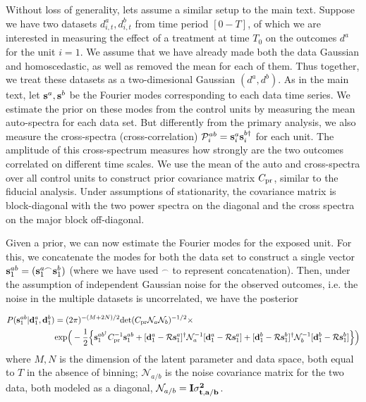 \documentclass{article}
\def\bs{{\bf s}}
\def\bd{{\bf d}}
\begin{document}
Without loss of generality, lets assume a similar setup to the main text. Suppose we have two datasets $d^a_{i, t}, d^b_{i, t}$ from time period $[0-T]$, of which we are interested in measuring the effect of a treatment at time $T_0$ on the outcomes $d^a$ for the unit $i=1$. We assume that we have already made both the data Gaussian and homoscedastic, as well as removed the mean for each of them. Thus together, we treat these datasets as a two-dimesional Gaussian $(d^a, d^b)$. As in the main text, let $\bs^a, \bs^b$ be the Fourier modes corresponding to each data time series. We estimate the prior on these modes from the control units by measuring the mean auto-spectra for each data set. But differently from the primary analysis, we also measure the cross-spectra (cross-correlation) $ \mathcal{P}_{i}^{ab} = \bs^a_i \bs_i^{b\dagger}$ for each unit. The amplitude of this cross-spectrum measures how strongly are the two outcomes correlated on different time scales. We use the mean of the auto and cross-spectra over all control units to construct prior covariance matrix $C_{\rm pr}$, similar to the fiducial analysis. Under assumptions of stationarity, the covariance matrix is block-diagonal with the two power spectra on the diagonal and the cross spectra on the major block off-diagonal. 

Given a prior, we can now estimate the Fourier modes for the exposed unit. For this, we concatenate the modes for both the data set to construct a single vector $\bs_1^{ab} = (\bs_1^{a \frown} \bs_1^b)$ (where we have used $^\frown$ to represent concatenation). Then, under the assumption of independent Gaussian noise for the observed outcomes, i.e. the noise in the multiple datasets is uncorrelated, we have the posterior

\begin{align}
    P(\bs_1^{ab}|\bd_1^a, \bd_1^b) &= (2\pi)^{-(M+2N)/2} {\rm det} (C_{\rm pr} \mathcal{N}_a \mathcal{N}_b)^{-1/2} \times \nonumber  \\
    & {\rm exp} \Big(-\frac{1}{2} \Big\{\bs_1^{ab^\dagger} C_{\rm pr}^{-1}\bs_1^{ab} + 
    [\bd_1^a - \mathcal{R}\bs_1^a]^\dagger \mathcal{N}^{-1}_a[\bd_1^a - \mathcal{R} \bs_1^a] + [\bd_1^b - \mathcal{R}\bs_1^b]^\dagger \mathcal{N}_b
    ^{-1}[\bd_1^b - \mathcal{R} \bs_1^b] \Big\}\Big)
    \label{eq:posteriorab}
\end{align}
where  $M, N$ is the dimension of the latent parameter and data space, both equal to $T$ in the absence of binning; $\mathcal{N}_{a/b}$ is the noise covariance matrix for the two data, both modeled as a diagonal, $\mathcal{N}_{a/b}=\bf{I}\sigma_{t,a/b}^2$. 
\end{document}
